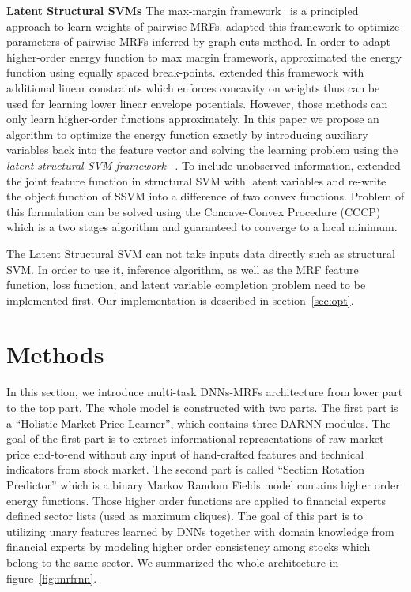 \documentclass[sigconf,anonymous,review]{acmart}
\renewcommand{\citename}{\citet}
\renewcommand{\cite}{\citep}
\begin{document}
\textbf{Latent Structural SVMs} The max-margin
framework~\cite{Taskar:ICML05,tsochantaridis2005large} is a
principled approach to learn weights of pairwise MRFs.
\citename{Szummer:ECCV08} adapted this framework to optimize
parameters of pairwise MRFs inferred by graph-cuts method. In
order to adapt higher-order energy function to max margin
framework, \citename{Gould:ICML2011} approximated the energy
function using equally spaced break-points.
\citename{gouldlearning} extended this framework with additional
linear constraints which enforces concavity on weights thus can
be used for learning lower linear envelope potentials. However,
those methods can only learn higher-order functions
approximately. In this paper we propose an algorithm to optimize
the energy function exactly by introducing auxiliary variables
back into the feature vector and solving the learning problem
using the \emph{latent structural SVM framework}
~\cite{yu2009learning}. To include unobserved information,
\citename{yu2009learning} extended the joint feature function in
structural SVM with latent variables and re-write the object
function of SSVM into a difference of two convex functions.
Problem of this formulation can be solved using the
Concave-Convex Procedure (CCCP)\cite{yuille2002concave} which is
a two stages algorithm and guaranteed to converge to a local
minimum.


The Latent Structural SVM can not take inputs data directly such
as structural SVM. In order to use it, inference algorithm, as
well as the MRF feature function, loss function, and latent
variable completion problem\cite{yu2009learning} need to be
implemented first. Our implementation is described in
section~\ref{sec:opt}.

\section{Methods}
\label{sec:meth}

In this section, we introduce multi-task DNNs-MRFs architecture
from lower part to the top part. The whole model is constructed
with two parts. The first part is a ``Holistic Market Price
Learner'', which contains three DARNN modules. The goal of the
first part is to extract informational representations of raw
market price end-to-end without any input of hand-crafted
features and technical indicators from stock market. The second
part is called ``Section Rotation Predictor'' which is a binary
Markov Random Fields model contains higher order energy
functions. Those higher order functions are applied to financial
experts defined sector lists (used as maximum cliques). The goal
of this part is to utilizing unary features learned by DNNs
together with domain knowledge from financial experts by modeling
higher order consistency among stocks which belong to the same
sector. We summarized the whole architecture in
figure~\ref{fig:mrfrnn}.
\end{document}
